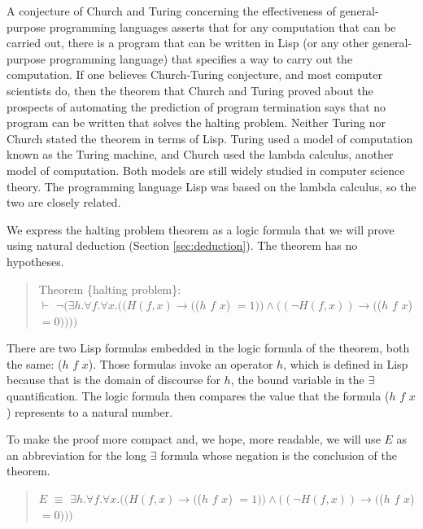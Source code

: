 \label{church-turing-hypothesis}
A conjecture of Church and Turing
concerning the effectiveness of general-purpose programming languages
asserts that for any computation that can be carried out, there is a program
that can be written in Lisp (or any other general-purpose programming language)
that specifies a way to carry out the computation.
If one believes Church-Turing conjecture, and most computer scientists do,
then the theorem that Church and Turing proved about the prospects of
automating the prediction of program termination
says that no program can be written that solves the halting problem.
Neither Turing nor Church stated the theorem in terms of Lisp.
Turing used a model of computation known as the Turing machine, and
Church used the lambda calculus, another model of computation.
Both models are still widely studied in computer science theory.
The programming language Lisp
was based on the lambda calculus, so the two are closely related.

We express the halting problem theorem as a logic formula that we will prove
using natural deduction (Section \ref{sec:deduction}).
The theorem has no hypotheses.
\begin{quote}
Theorem \{halting problem\}:\\
$\vdash$ $\neg(\exists h. \forall f. \forall x.
((H(f, x) \rightarrow ($($h$ $f$ $x$) $ = 1)) \wedge ((\neg H(f, x)) \rightarrow ($($h$ $f$ $x$) $= 0))))$
\end{quote}

There are two Lisp formulas embedded in
the logic formula of the theorem, both the same:
($h$ $f$ $x$).
Those formulas invoke an operator $h$, which is defined in Lisp because that is the domain
of discourse for $h$, the bound variable in the $\exists$ quantification.
The logic formula then compares the value that
the formula ($h$ $f$ $x$) represents to a natural number.

To make the proof more compact and, we hope, more readable,
we will use $E$ as an abbreviation for the
long $\exists$ formula whose negation is the conclusion of the theorem.
\begin{quote}
$E$ $\equiv$ $\exists h. \forall f. \forall x.
((H(f, x) \rightarrow ($($h$ $f$ $x$) $ = 1)) \wedge ((\neg H(f, x)) \rightarrow ($($h$ $f$ $x$) $= 0)))$
\end{quote}

